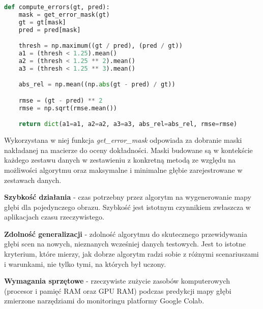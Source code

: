 \begin{lstlisting}[style=EEStyle,language=python,numbers=none,frame=none]
def compute_errors(gt, pred):
    mask = get_error_mask(gt)
    gt = gt[mask]
    pred = pred[mask]

    thresh = np.maximum((gt / pred), (pred / gt))
    a1 = (thresh < 1.25).mean()
    a2 = (thresh < 1.25 ** 2).mean()
    a3 = (thresh < 1.25 ** 3).mean()

    abs_rel = np.mean((np.abs(gt - pred) / gt))

    rmse = (gt - pred) ** 2
    rmse = np.sqrt(rmse.mean())

    return dict(a1=a1, a2=a2, a3=a3, abs_rel=abs_rel, rmse=rmse)
\end{lstlisting}

Wykorzystana w niej funkcja \textit{get\_error\_mask} odpowiada za dobranie maski nakładanej na macierze do oceny dokładności. Maski budowane są w kontekście każdego zestawu danych w zestawieniu z konkretną metodą ze względu na możliwości algorytmu oraz maksymalne i minimalne głębie zarejestrowane w zestawach danych.

\textbf{Szybkość działania} - czas potrzebny przez algorytm na wygenerowanie mapy głębi dla pojedynczego obrazu. Szybkość jest istotnym czynnikiem zwłaszcza w aplikacjach czasu rzeczywistego.

\textbf{Zdolność generalizacji} - zdolność algorytmu do skutecznego przewidywania głębi scen na nowych, nieznanych wcześniej danych testowych. Jest to istotne kryterium, które mierzy, jak dobrze algorytm radzi sobie z różnymi scenariuszami i warunkami, nie tylko tymi, na których był uczony.

\textbf{Wymagania sprzętowe} - rzeczywiste zużycie zasobów komputerowych (procesor i pamięć RAM oraz GPU RAM) podczas predykcji mapy głębi zmierzone narzędziami do monitoringu platformy Google Colab.

